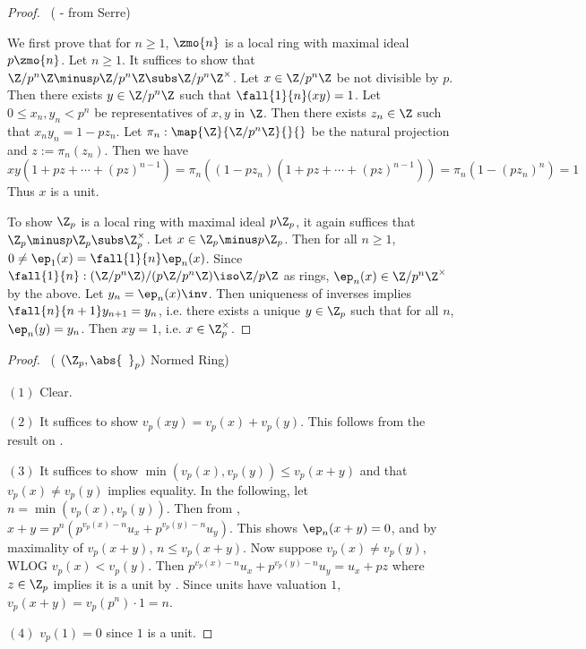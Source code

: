 \begin{proof}~( - from Serre)

  We first prove that for $n \geq 1$, 
  $\zmo{n}$ is a local ring with maximal ideal $p\zmo{n}$.
  Let $n \geq 1$. 
  It suffices to show that $\Z/p^n\Z \minus p\Z/p^n\Z \subs \Z/p^n\Z^\times$. 
  Let $x \in \Z/p^n\Z$ be not divisible by $p$. 
  Then there exists $y \in \Z/p^n\Z$ such that $\fall{1}{n} (x y) = 1$.
  Let $0 \leq x_n, y_n < p^n$ be representatives of $x, y$ in $\Z$. 
  Then there exists $z_n \in \Z$ such that $x_n y_n = 1 - p z_n$. 
  Let $\pi_n : \map{\Z}{\Z/p^n\Z}{}{}$ be the natural projection and 
  $z := \pi_n(z_n)$. 
  Then we have \[
    x y (1 + p z + \cdots + (pz)^{n-1})
    = \pi_n((1 - p z_n)(1 + p z + \cdots + (pz)^{n-1}))
    = \pi_n(1 - (p z_n)^n)
    = 1 
  \]
  Thus $x$ is a unit. 

  To show $\Z_p$ is a local ring with maximal ideal $p\Z_p$, 
  it again suffices that $\Z_p\minus p\Z_p \subs \Z_p^\times$. 
  Let $x \in \Z_p\minus p\Z_p$. 
  Then for all $n \geq 1$, $0 \neq \ep_1(x) = \fall{1}{n}\ep_n(x)$. 
  Since $\fall{1}{n} : (\Z/p^n\Z) / (p\Z/p^n\Z) \iso \Z/p\Z$ as rings, 
  $\ep_n(x) \in \Z/p^n\Z^\times$ by the above. 
  Let $y_n = \ep_n(x)\inv$. 
  Then uniqueness of inverses implies $\fall{n}{n+1} y_{n+1} = y_n$,
  i.e. there exists a unique $y \in \Z_p$ such that 
  for all $n$, $\ep_n(y) = y_n$.
  Then $x y = 1$, i.e. $x \in \Z_p^\times$. 
\end{proof}

\begin{proof}~(
  {$(\Z_p,\abs{\hspace{5pt}}_p)$ Normed Ring})
  
  $(1)$ Clear. 

  $(2)$ It suffices to show $v_p(x y) = v_p(x) + v_p(y)$. 
  This follows from the result on 
  .

  $(3)$ It suffices to show $\min(v_p(x),v_p(y)) \leq v_p(x + y)$ 
  and that $v_p(x) \neq v_p(y)$ implies equality. 
  In the following, let $n = \min(v_p(x),v_p(y))$.
  Then from , 
  $x + y = p^n (p^{v_p(x) - n}u_x + p^{v_p(y) - n}u_y)$.
  This shows $\ep_n(x + y) = 0$, and by maximality of $v_p(x+y)$,
  $n \leq v_p(x + y)$. 
  Now suppose $v_p(x) \neq v_p(y)$, WLOG $v_p(x) < v_p(y)$.
  Then $p^{v_p(x) - n}u_x + p^{v_p(y) - n}u_y = u_x + p z$ where $z \in \Z_p$
  implies it is a unit by .
  Since units have valuation $1$, $v_p(x + y) = v_p(p^n) \cdot 1 = n$. 

  $(4)$ $v_p(1) = 0$ since $1$ is a unit. 
\end{proof}

